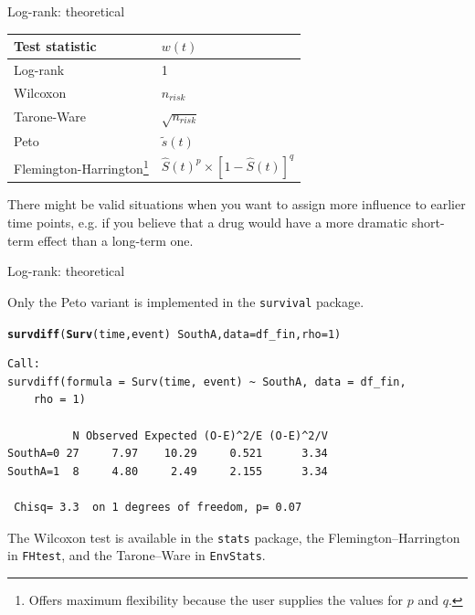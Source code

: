 \documentclass[12pt,english,pdf,xcolor=dvipsnames,aspectratio=169]{beamer}\usepackage[]{graphicx}\usepackage[]{xcolor}
\makeatletter
\newcommand{\hlnum}[1]{\textcolor[rgb]{0.686,0.059,0.569}{#1}}%
\newcommand{\hlopt}[1]{\textcolor[rgb]{0,0,0}{#1}}%
\newcommand{\hlstd}[1]{\textcolor[rgb]{0.345,0.345,0.345}{#1}}%
\newcommand{\hlkwc}[1]{\textcolor[rgb]{0.333,0.667,0.333}{#1}}%
\newcommand{\hlkwd}[1]{\textcolor[rgb]{0.737,0.353,0.396}{\textbf{#1}}}%
\newenvironment{kframe}{%
 \def\at@end@of@kframe{}%
 \ifinner\ifhmode%
  \def\at@end@of@kframe{\end{minipage}}%
  \begin{minipage}{\columnwidth}%
 \fi\fi%
 \def\FrameCommand##1{\hskip\@totalleftmargin \hskip-\fboxsep
 \colorbox{shadecolor}{##1}\hskip-\fboxsep
     \hskip-\linewidth \hskip-\@totalleftmargin \hskip\columnwidth}%
 \MakeFramed {\advance\hsize-\width
   \@totalleftmargin\z@ \linewidth\hsize
   \@setminipage}}%
 {\par\unskip\endMakeFramed%
 \at@end@of@kframe}
\newenvironment{knitrout}{}{} %
\makeatother
\begin{document}
\begin{frame}{Log-rank: theoretical}

\begin{table}
\centering
\begin{tabular}{l l}
\toprule
Test statistic & $w(t)$ \\
\midrule
Log-rank & 1 \\
Wilcoxon & $n_{risk}$ \\
Tarone-Ware & $\sqrt{n_{risk}}$ \\ 
Peto & $\widetilde{s}(t)$ \\
Flemington-Harrington\footnote{Offers maximum flexibility because the user supplies the values for $p$ and $q$.} & $\widehat{S}(t)^p \times [1 - \widehat{S}(t)]^q$ \\
\bottomrule
\end{tabular}
\end{table}

There might be valid situations when you want to assign more influence to earlier time points, e.g. if you believe that a drug would have a more dramatic short-term effect than a long-term one.
\end{frame}




\begin{frame}[fragile]{Log-rank: theoretical}

Only the Peto variant is implemented in the \texttt{survival} package.\bigskip

\begin{knitrout}\scriptsize
{}\color{fgcolor}\begin{kframe}
\begin{alltt}
\hlkwd{survdiff}\hlstd{(}\hlkwd{Surv}\hlstd{(time, event)} \hlopt{~} \hlstd{SouthA,} \hlkwc{data} \hlstd{= df_fin,} \hlkwc{rho} \hlstd{=} \hlnum{1}\hlstd{)}
\end{alltt}
\begin{verbatim}
Call:
survdiff(formula = Surv(time, event) ~ SouthA, data = df_fin, 
    rho = 1)

          N Observed Expected (O-E)^2/E (O-E)^2/V
SouthA=0 27     7.97    10.29     0.521      3.34
SouthA=1  8     4.80     2.49     2.155      3.34

 Chisq= 3.3  on 1 degrees of freedom, p= 0.07 
\end{verbatim}
\end{kframe}
\end{knitrout}

The Wilcoxon test is available in the \texttt{stats} package, the Flemington--Harrington in \texttt{FHtest}, and the Tarone--Ware in \texttt{EnvStats}.


\end{frame}
\end{document}
